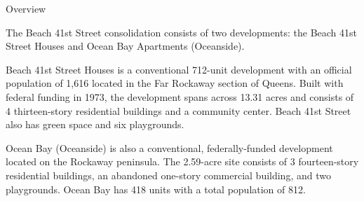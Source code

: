 Overview

The Beach 41st Street consolidation consists of two developments: the Beach 41st Street Houses and Ocean Bay Apartments (Oceanside). 

Beach 41st Street Houses is a conventional 712-unit development with an official population of 1,616 located in the Far Rockaway section of Queens. Built with federal funding in 1973, the development spans across 13.31 acres and consists of 4 thirteen-story residential buildings and a community center. Beach 41st Street also has green space and six playgrounds. 

Ocean Bay (Oceanside) is also a conventional, federally-funded development located on the Rockaway peninsula. The 2.59-acre site consists of 3 fourteen-story residential buildings, an abandoned one-story commercial building, and two playgrounds. Ocean Bay has 418 units with a total population of 812. 